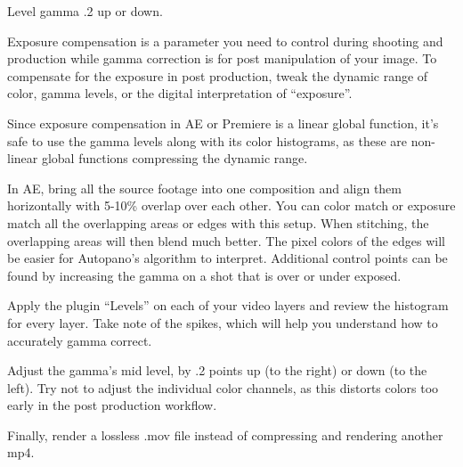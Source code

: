 \begin{fullwidth}
{\large Level gamma .2 up or down. \par}

Exposure compensation is a parameter you need to control during shooting and production while gamma correction is for post manipulation of your image. To compensate for the exposure in post production, tweak the dynamic range of color, gamma levels, or the digital interpretation of “exposure”. 

Since exposure compensation in AE or Premiere is a linear global function, it’s safe to use the gamma levels along with its color histograms, as these are non-linear global functions compressing the dynamic range. 

In AE, bring all the source footage into one composition and align them horizontally with 5-10\% overlap over each other. You can color match or exposure match all the overlapping areas or edges with this setup. When stitching, the overlapping areas will then blend much better. The pixel colors of the edges will be easier for Autopano’s algorithm to interpret. Additional control points can be found by increasing the gamma on a shot that is over or under exposed.

Apply the plugin “Levels” on each of your video layers and review the histogram for every layer. Take note of the spikes, which will help you understand how to accurately gamma correct.

Adjust the gamma’s mid level, by .2 points up (to the right) or down (to the left). Try not to adjust the individual color channels, as this distorts colors too early in the post production workflow.

Finally, render a lossless .mov file instead of compressing and rendering another mp4.


\clearpage
\end{fullwidth}